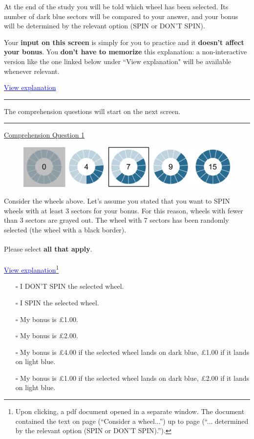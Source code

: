 \noindent At the end of the study you will be told which wheel has been selected.
Its number of dark blue sectors will be compared to your answer, and your bonus will be determined by the relevant option (SPIN or DON'T SPIN).\label{end}

\noindent Your \textbf{input on this screen} is simply for you to practice and it \textbf{doesn't affect your bonus}.
You \textbf{don't have to memorize} this explanation: a non-interactive version like the one linked below under ``View explanation" will be available whenever relevant.

\noindent \textcolor{blue}{\underline{View explanation}}

\bigskip
\noindent \rule{\linewidth}{0.4pt}

\noindent The comprehension questions will start on the next screen.

\bigskip
\noindent \rule{\linewidth}{0.4pt}

\noindent \underline{Comprehension Question 1}

\begin{figure}[h!]
	\centering
	{\includegraphics[width=\linewidth]{five_wheelsS1_15.pdf}}
\end{figure}
 
\noindent Consider the wheels above.
Let's assume you stated that you want to SPIN wheels with at least 3 sectors for your bonus.
For this reason, wheels with fewer than 3 sectors are grayed out.
The wheel with 7 sectors has been randomly selected (the wheel with a black border).\\
\\
\noindent Please select \textbf{all that apply}.\\
 \\
\noindent \textcolor{blue}{\underline{View explanation}}\footnote{
Upon clicking, a pdf document opened in a separate window.
The document contained the text on page \pageref{explanation} (``Consider a wheel...'') up to page \pageref{end} (``... determined by the relevant option (SPIN or DON'T SPIN).'').
}\\
\begin{itemize}
\item[$\square$] I DON'T SPIN the selected wheel.
\item[$\square$] I SPIN the selected wheel.
\item[$\square$] My bonus is £1.00.
\item[$\square$] My bonus is £2.00.
\item[$\square$] My bonus is £4.00 if the selected wheel lands on dark blue, £1.00 if it lands on light blue.
\item[$\square$] My bonus is £1.00 if the selected wheel lands on dark blue, £2.00 if it lands on light blue.
\end{itemize}

